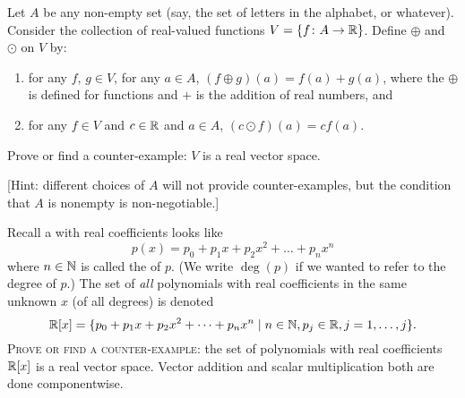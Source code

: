 \begin{exercise}
Let $A$ be any non-empty set (say, the set of letters in the alphabet,
or whatever). Consider the collection of real-valued functions
$V=\{f\colon A\to\mathbb{R}\}$. Define $\oplus$ and $\odot$ on $V$ by:
\begin{enumerate}
\item for any $f$, $g\in V$, for any $a\in A$, $(f\oplus g)(a) = f(a) + g(a)$,
where the $\oplus$ is defined for functions and $+$ is the addition of
real numbers, and
\item for any $f\in V$ and $c\in\mathbb{R}$ and $a\in A$, $(c\odot f)(a)=cf(a)$.
\end{enumerate}
Prove or find a counter-example: $V$ is a real vector space.

[Hint: different choices of $A$ will not provide counter-examples, but
  the condition that $A$ is nonempty is non-negotiable.]
\end{exercise}

\begin{exercise}
  Recall a  with real coefficients looks like
  \begin{equation}
p(x) = p_{0} + p_{1}x + p_{2}x^{2} + \dots + p_{n}x^{n}
  \end{equation}
  where $n\in\mathbb{N}$ is called the  of $p$. (We write
  $\deg(p)$ if we wanted to refer to the degree of $p$.) The set of
  \emph{all} polynomials with real coefficients in the same unknown $x$
  (of all degrees) is denoted
  \begin{equation}
\mathbb{R}[x] = \{p_{0} + p_{1}x + p_{2}x^{2} + \dots + p_{n}x^{n}\mid n\in\mathbb{N},
  p_{j}\in\mathbb{R}, j=1,\dots,j\}.
  \end{equation}
  \textsc{Prove or find a counter-example:} the set of polynomials with real
  coefficients $\mathbb{R}[x]$ is a real vector space.
  Vector addition and scalar multiplication both are done componentwise.
\end{exercise}
